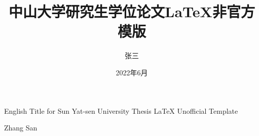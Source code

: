 \title{中山大学研究生学位论文\LaTeX{}非官方模版}
{English Title for Sun Yat-sen University Thesis \LaTeX{} Unofficial Template}

\author{张三}{Zhang San}







\date{2022年6月}

\newcommand{\dd}{\mathrm{d}}
\usepackage{longtable}
\usepackage{tablefootnote}
\usepackage{hologo}
